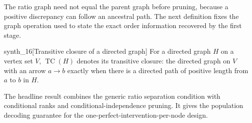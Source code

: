 The ratio graph need not equal the parent graph before pruning, because a positive discrepancy can follow an ancestral path. The next definition fixes the graph operation used to state the exact order information recovered by the first stage.

\begin{definitionv}{synth_16}[Transitive closure of a directed graph]
For a directed graph \(H\) on a vertex set \(V\), \(\operatorname{TC}(H)\) denotes its transitive closure: the directed graph on \(V\) with an arrow \(a\to b\) exactly when there is a directed path of positive length from \(a\) to \(b\) in \(H\).
\end{definitionv}

The headline result combines the generic ratio separation condition with conditional ranks and conditional-independence pruning. It gives the population decoding guarantee for the one-perfect-intervention-per-node design.


